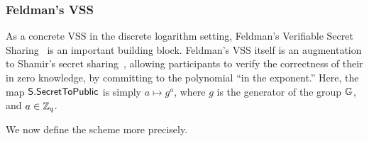 

\subsubsection{Feldman's VSS}
\label{feldman-vss}

As a concrete VSS in the discrete logarithm setting,
Feldman's Verifiable Secret Sharing~\cite{Feldman87} is an important building block.
Feldman's VSS itself is an augmentation to Shamir's secret
sharing~\cite{Shamir79}, allowing participants to verify the correctness of
their in zero knowledge, by committing to the polynomial ``in the exponent.''
Here, the map $\mathsf{S}.\mathsf{SecretToPublic}$ is simply $a \mapsto g^a$,
where $g$ is the generator of the group $\mathbb{G}$, and
$a \in \mathbb{Z}_q$.

We now define the scheme more precisely.

